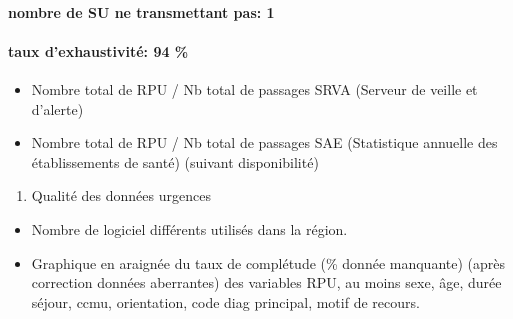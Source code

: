 \documentclass[]{article}
\begin{document}
\paragraph{nombre de SU ne transmettant pas:
1}\label{nombre-de-su-ne-transmettant-pas-1}

\paragraph{taux d'exhaustivité: 94 \%}\label{taux-dexhaustivite-94}

\begin{itemize}
\item
  Nombre total de RPU / Nb total de passages SRVA (Serveur de veille et
  d'alerte)
\item
  Nombre total de RPU / Nb total de passages SAE (Statistique annuelle
  des établissements de santé) (suivant disponibilité)
\end{itemize}

\begin{enumerate}
\def\labelenumi{\roman{enumi}.}
\setcounter{enumi}{1}
\itemsep1pt\parskip0pt
\item
  Qualité des données urgences
\end{enumerate}

\begin{itemize}
\item
  Nombre de logiciel différents utilisés dans la région.
\item
  Graphique en araignée du taux de complétude (\% donnée manquante)
  (après correction données aberrantes) des variables RPU, au moins
  sexe, âge, durée séjour, ccmu, orientation, code diag principal, motif
  de recours.
\end{itemize}
\end{document}
